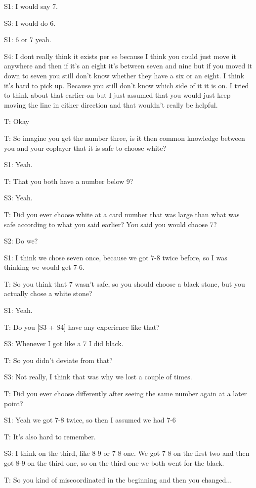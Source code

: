 S1: I would say 7.

S3: I would do 6.

S1: 6 or 7 yeah.

S4: I dont really think it exists per se because I think you could just move it anywhere and then if it's an eight it's between seven and nine but if you moved it down to seven you still don't know whether they have a six or an eight. I think it's hard to pick up. Because you still don't know which side of it it is on. I tried to think about that earlier on but I just assumed that you would just keep moving the line in either direction and that wouldn't really be helpful.

T: Okay

T: So imagine you get the number three, is it then common knowledge between you and your coplayer that it is safe to choose white?

S1: Yeah.

T: That you both have a number below 9?

S3: Yeah.

T: Did you ever choose white at a card number that was large than what was safe according to what you said earlier? You said you would choose 7?

S2: Do we?

S1: I think we chose seven once, because we got 7-8 twice before, so I was thinking we would get 7-6.

T: So you think that 7 wasn't safe, so you should choose a black stone, but you actually chose a white stone?

S1: Yeah.

T: Do you [S3 + S4] have any experience like that?

S3: Whenever I got like a 7 I did black.

T: So you didn't deviate from that?

S3: Not really, I think that was why we lost a couple of times.

T: Did you ever choose differently after seeing the same number again at a later point?

S1: Yeah we got 7-8 twice, so then I assumed we had 7-6

T: It's also hard to remember.

S3: I think on the third, like 8-9 or 7-8 one. We got 7-8 on the first two and then got 8-9 on the third one, so on the third one we both went for the black.

T: So you kind of miscoordinated in the beginning and then you changed...

